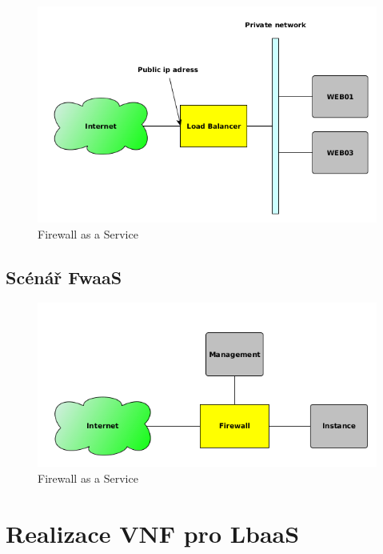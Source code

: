 \begin{figure}[h]
\begin{centering}
\includegraphics[scale=0.6]{images/LoadBalancer}
\par\end{centering}
\caption{Firewall as a Service\label{fig:loadbalancer}}
\end{figure}



\subsection{Scénář FwaaS}

\begin{figure}[h]
\begin{centering}
\includegraphics[scale=0.6]{images/firewall}
\par\end{centering}
\caption{Firewall as a Service\label{fig:firewall}}
\end{figure}

\section{Realizace VNF pro LbaaS}

